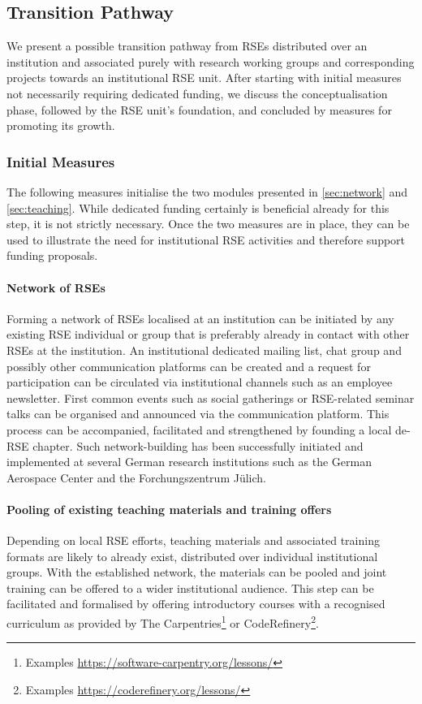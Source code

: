 \documentclass[a4paper]{article}
\begin{document}
\subsection{Transition Pathway}

We present a possible transition pathway from RSEs distributed over an institution and associated purely with research working groups and corresponding projects towards an institutional RSE unit.
After starting with initial measures not necessarily requiring dedicated funding, we discuss the conceptualisation phase, followed by the RSE unit's foundation, and concluded by measures for promoting its growth.

\subsubsection{Initial Measures}
The following measures initialise the two modules presented in \autoref{sec:network} and \autoref{sec:teaching}.
While dedicated funding certainly is beneficial already for this step, it is not strictly necessary.
Once the two measures are in place, they can be used to illustrate the need for institutional RSE activities and therefore support funding proposals.

\paragraph{Network of RSEs}
Forming a network of RSEs localised at an institution can be initiated by any existing RSE individual or group that is preferably already in contact with other RSEs at the institution.
An institutional dedicated mailing list, chat group and possibly other communication platforms can be created and a request for participation can be circulated via institutional channels such as an employee newsletter.
First common events such as social gatherings or RSE-related seminar talks can be organised and announced via the communication platform.
This process can be accompanied, facilitated and strengthened by founding a local de-RSE chapter.
Such network-building has been successfully initiated and implemented at several German research institutions such as the German Aerospace Center and the Forchungszentrum Jülich.

\paragraph{Pooling of existing teaching materials and training offers}
Depending on local RSE efforts, teaching materials and associated training formats are likely to already exist,
distributed over individual institutional groups.
With the established network, the materials can be pooled and joint training can be offered to a wider institutional audience.
This step can be facilitated and formalised by offering introductory courses with a recognised curriculum as provided by The Carpentries\footnote{Examples \url{https://software-carpentry.org/lessons/}}
or CodeRefinery\footnote{Examples \url{https://coderefinery.org/lessons/}}.
\end{document}
